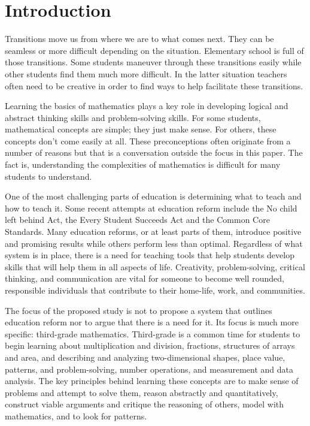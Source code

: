
\section*{Introduction}
Transitions move us from where we are to what comes next.
They can be seamless or more difficult depending on the situation.
Elementary school is full of those transitions.
Some students maneuver through these transitions easily while other students find them much more difficult. 
In the latter situation teachers often need to be creative in order to find ways to help facilitate these transitions.

Learning the basics of mathematics plays a key role in developing logical and abstract thinking skills and problem-solving skills.
For some students, mathematical concepts are simple; they just make sense.
For others, these concepts don’t come easily at all.
These preconceptions often originate from a number of reasons but that is a conversation outside the focus in this paper.
The fact is, understanding the complexities of mathematics is difficult for many students to understand.

One of the most challenging parts of education is determining what to teach and how to teach it.
Some recent attempts at education reform include the No child left behind Act,  the Every Student Succeeds Act and the Common Core Standards.
Many education reforms, or at least parts of them, introduce positive and promising results while others perform less than optimal.
Regardless of what system is in place, there is a need for teaching tools that help students develop skills that will help them in all aspects of life.
Creativity, problem-solving, critical thinking, and communication are vital for someone to become well rounded, responsible individuals that contribute to their home-life, work, and communities.

The focus of the proposed study is not to propose a system that outlines education reform nor to argue that there is a need for it.
Its focus is much more specific: third-grade mathematics.
Third-grade is a common time for students to begin learning about multiplication and division, fractions, structures of arrays and area, and describing and analyzing two-dimensional shapes, place value, patterns, and problem-solving, number operations, and measurement and data analysis.
The key principles behind learning these concepts are to make sense of problems and attempt to solve them, reason abstractly and quantitatively, construct viable arguments and critique the reasoning of others, model with mathematics, and to look for patterns.

